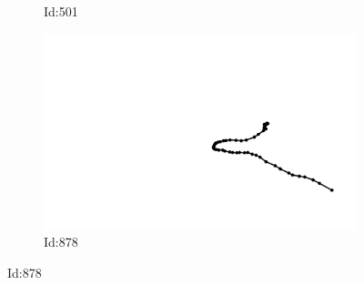 \documentclass[12pt,twoside]{report}
\begin{document}
\begin{figure}
\begin{subfigure}[b]{0.20\textwidth}
\caption{Id:501}
\end{subfigure}
\begin{subfigure}[b]{0.20\textwidth}
\centering
\includegraphics[width=\textwidth]{../../trajectories/878.png}
\caption{Id:878}
\end{subfigure}
\end{figure}
\end{document}
